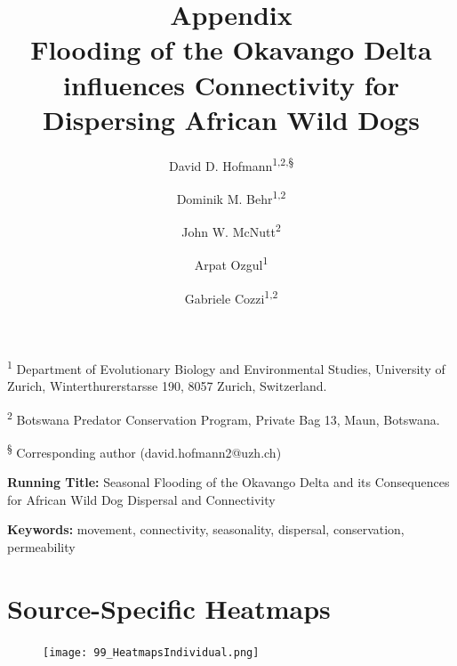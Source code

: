 \documentclass[abstract=on,10pt,a4paper,bibliography=totocnumbered]{article}
\title{\textbf{Appendix}\\ Flooding of the Okavango Delta influences
Connectivity for Dispersing African Wild Dogs}
\author{
  David D. Hofmann\textsuperscript{1,2,\S} \orcid{0000-0003-3477-4365} \and
  Dominik M. Behr\textsuperscript{1,2} \orcid{0000-0001-7378-8538} \and
  John W. McNutt\textsuperscript{2} \and
  Arpat Ozgul\textsuperscript{1} \orcid{0000-0001-7477-2642} \and
  Gabriele Cozzi\textsuperscript{1,2} \orcid{0000-0002-1744-1940}
}
\newcommand{\beginappendix}{%
  \setcounter{table}{0}
  \renewcommand{\thetable}{S\arabic{table}}%
  \setcounter{figure}{0}
  \renewcommand{\thefigure}{S\arabic{figure}}%
  \setcounter{equation}{0}
  \renewcommand{\theequation}{Equation S\arabic{equation}}%
  \setcounter{section}{0}
  \renewcommand{\thesection}{A.\arabic{section}}%
}
\renewcommand{\theequation}{Equation \arabic{equation}}%
\begin{document}



\maketitle

\begin{flushleft}

\vspace{0.5cm}

\textsuperscript{1} Department of Evolutionary Biology and Environmental
Studies, University of Zurich, Winterthurerstarsse 190, 8057 Zurich,
Switzerland.

\textsuperscript{2} Botswana Predator Conservation Program, Private Bag 13,
Maun, Botswana.

\textsuperscript{\S} Corresponding author (david.hofmann2@uzh.ch)

\vspace{4cm}

\textbf{Running Title:} Seasonal Flooding of the Okavango Delta and its
Consequences for African Wild Dog Dispersal and Connectivity

\vspace{0.5cm}

\textbf{Keywords:} movement, connectivity, seasonality, dispersal, conservation,
permeability

\end{flushleft}

\newpage



\appendix
\beginappendix

\newpage
\section{Source-Specific Heatmaps}
\begin{figure}[htbp]
  \begin{center}
  \texttt{[image: 99\_HeatmapsIndividual.png]}
  \caption{}
  \label{Heatmaps}
  \end{center}
\end{figure}
\end{document}
